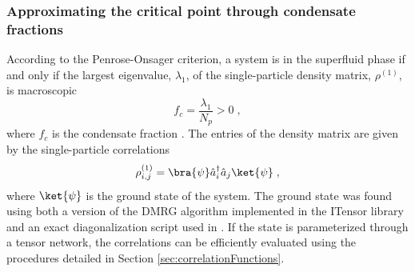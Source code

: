 \subsubsection{Approximating the critical point through condensate fractions}

According to the Penrose-Onsager criterion, a system is in the superfluid phase if and only if the largest eigenvalue, $\lambda_1$, of the single-particle density matrix, $\rho^{(1)}$, is macroscopic
\begin{equation}
	f_c = \frac{\lambda_1}{N_p} > 0 \; ,
	\label{eq:condensateFraction}
\end{equation} 
where $f_c$ is the condensate fraction \cite{PenroseOnsager}. The entries of the density matrix are given by the single-particle correlations
\begin{equation}
	\rho_{i,j}^{(1)} = \bra{\psi} \hat{a}_{i}^{\dag} \hat{a}_{j} \ket{\psi} \; ,
	\label{eq:DensityMatrixEntry}
\end{equation}
where $\ket{\psi}$ is the ground state of the system. The ground state was found using both a version of the DMRG algorithm implemented in the ITensor library \cite{ITensor} and an exact diagonalization script used in \cite{MajaJulie}. If the state is parameterized through a tensor network, the correlations can be efficiently evaluated using the procedures detailed in Section \ref{sec:correlationFunctions}.

